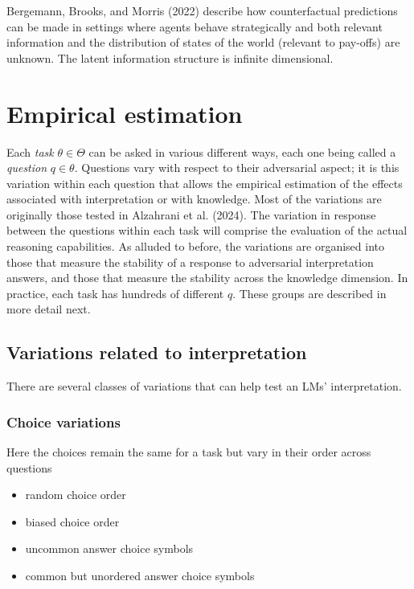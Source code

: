 \documentclass[
]{article}
\begin{document}
Bergemann, Brooks, and Morris (2022) describe how counterfactual
predictions can be made in settings where agents behave strategically
and both relevant information and the distribution of states of the
world (relevant to pay-offs) are unknown. The latent information
structure is infinite dimensional.

\section{Empirical estimation}\label{empirical-estimation}

Each \emph{task} \(\theta \in \Theta\) can be asked in various different
ways, each one being called a \emph{question} \(q \in \theta\).
Questions vary with respect to their adversarial aspect; it is this
variation within each question that allows the empirical estimation of
the effects associated with interpretation or with knowledge. Most of
the variations are originally those tested in Alzahrani et al. (2024).
The variation in response between the questions within each task will
comprise the evaluation of the actual reasoning capabilities. As alluded
to before, the variations are organised into those that measure the
stability of a response to adversarial interpretation answers, and those
that measure the stability across the knowledge dimension. In practice,
each task has hundreds of different \(q\). These groups are described in
more detail next.

\subsection{Variations related to
interpretation}\label{variations-related-to-interpretation}

There are several classes of variations that can help test an LMs'
interpretation.

\subsubsection{Choice variations}\label{choice-variations}

Here the choices remain the same for a task but vary in their order
across questions

\begin{itemize}
\item
  random choice order
\item
  biased choice order
\item
  uncommon answer choice symbols
\item
  common but unordered answer choice symbols
\end{itemize}
\end{document}
